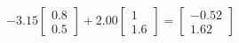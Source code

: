 \documentclass[preview]{standalone}
\begin{document}
\begin{align*}
-3.15 \begin{bmatrix} 0.8 \\ 0.5 \end{bmatrix} + 2.00 \begin{bmatrix} 1 \\ 1.6 \end{bmatrix} = \begin{bmatrix} -0.52 \\ 1.62 \end{bmatrix}
\end{align*}
\end{document}
